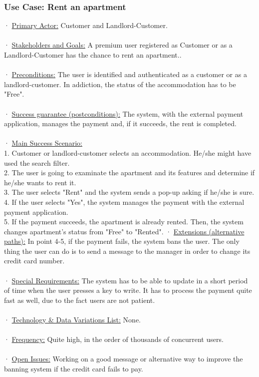\documentclass[12pt]{article}
\begin{document}
{\subsubsection{Use Case: Rent an apartment}
· \underline{Primary Actor:} Customer and Landlord-Customer.\\\\
· \underline{Stakeholders and Goals:} A premium user registered as Customer or as a Landlord-Customer has the chance to rent an apartment..\\\\
· \underline{Preconditions:} The user is identified and authenticated as a customer or as a landlord-customer. In addiction, the status of the accommodation has to be "Free".\\\\
· \underline{Success guarantee (postconditions):} The system, with the external payment application, manages the payment and, if it succeeds, the rent is completed.\\\\
· \underline{Main Success Scenario:}\\
1. Customer or landlord-customer selects an accommodation. He/she might have used the search filter.\\
2. The user is going to examinate the apartment and its features and determine if he/she wants to rent it.\\
3. The user selects "Rent" and the system sends a pop-up asking if he/she is sure.\\
4. If the user selects "Yes", the system manages the payment with the external payment application.\\
5. If the payment succeeds, the apartment is already rented. Then, the system changes apartment's status from "Free" to "Rented".
· \underline{Extensions (alternative paths):} In point 4-5, if the payment fails, the system bans the user. The only thing the user can do is to send a message to the manager in order to change its credit card number.\\\\
· \underline{Special Requirements:} The system has to be able to update in a short period of time when the user presses a key to write. It has to process the payment quite fast as well, due to the fact users are not patient.\\\\
· \underline{Technology \& Data Variations List:} None.\\\\
· \underline{Frequency:} Quite high, in the order of thousands of concurrent users.\\\\
· \underline{Open Issues:} Working on a good message or alternative way to improve the banning system if the credit card fails to pay.\\

}
\end{document}
